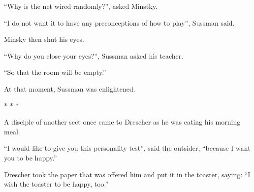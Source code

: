 ``Why is the net wired randomly?'', asked Minstky.

``I do not want it to have any preconceptions of how to play'', Sussman said.

Minsky then shut his eyes.

``Why do you close your eyes?'', Sussman asked his teacher.

``So that the room will be empty.''

At that moment, Sussman was enlightened.

\begin{center}* * *\end{center}

A disciple of another sect once came to Drescher as he was eating his morning
meal.

``I would like to give you this personality test'', said the outsider, ``because
I want you to be happy.''

Drescher took the paper that was offered him and put it in the toaster, saying:
``I wish the toaster to be happy, too.''

